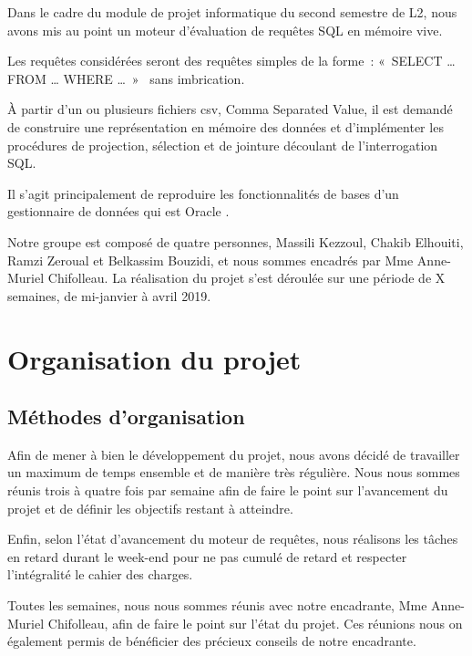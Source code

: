 \documentclass[oneside,13pt,a4paper]{report}
\begin{document}
        Dans le cadre du module de projet informatique du second semestre de L2, nous avons mis au point un moteur d’évaluation de requêtes SQL en mémoire vive.

        Les requêtes considérées seront des requêtes simples de la forme : « SELECT … FROM … WHERE … »  sans imbrication.

        À partir d’un ou plusieurs fichiers csv, Comma Separated Value, il est demandé de construire une représentation en mémoire des données et d’implémenter les procédures de projection, sélection et de jointure découlant de l’interrogation SQL.

        Il s’agit principalement de reproduire les fonctionnalités de bases d’un gestionnaire de données qui est Oracle .

        Notre groupe est composé de quatre personnes, Massili Kezzoul, Chakib Elhouiti, Ramzi Zeroual et Belkassim Bouzidi, et nous sommes encadrés par Mme Anne-Muriel Chifolleau. La réalisation du projet s’est déroulée sur une période de X semaines, de mi-janvier à avril 2019.


    \chapter{Organisation du projet}
        \section{Méthodes d’organisation}

            Afin de mener à bien le développement du projet, nous avons décidé de travailler un maximum de temps ensemble et de manière très régulière. Nous nous sommes réunis trois à quatre fois par semaine afin de faire le point sur l’avancement du projet et de définir les objectifs restant à atteindre.
            
            Enfin, selon l’état d’avancement du moteur de requêtes, nous réalisons les tâches en retard durant le week-end pour ne pas cumulé de retard et respecter l’intégralité le cahier des charges.
            
            Toutes les semaines, nous nous sommes réunis avec notre encadrante, Mme Anne-Muriel Chifolleau, afin de faire le point sur l’état du projet. Ces réunions nous on également permis de bénéficier des précieux conseils de notre encadrante.
\end{document}
